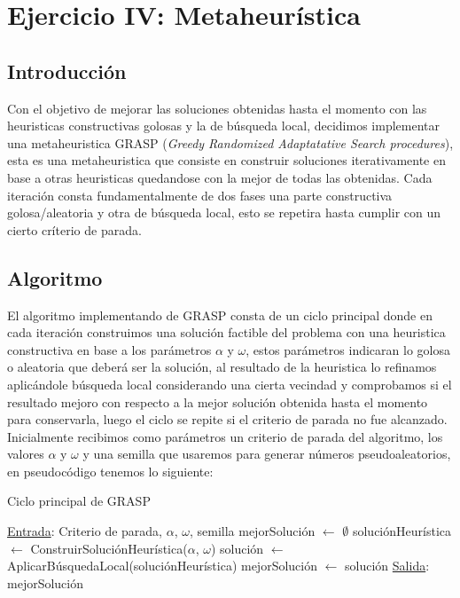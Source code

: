 \section{Ejercicio IV: Metaheur\'istica}

\subsection{Introducci\'on}

Con el objetivo de mejorar las soluciones obtenidas hasta el momento con las heuristicas constructivas golosas y la de búsqueda local, decidimos implementar una metaheuristica GRASP (\textit{Greedy Randomized Adaptatative Search procedures}), esta es una metaheuristica que consiste en construir soluciones iterativamente en base a otras heuristicas quedandose con la mejor de todas las obtenidas. Cada iteración consta fundamentalmente de dos fases una parte constructiva golosa/aleatoria y otra de búsqueda local, esto se repetira hasta cumplir con un cierto críterio de parada.

\subsection{Algoritmo}

El algoritmo implementando de GRASP consta de un ciclo principal donde en cada iteración construimos una solución factible del problema con una heuristica constructiva en base a los parámetros $\alpha$ y $\omega$, estos parámetros indicaran lo golosa o aleatoria que deberá ser la solución, al resultado de la heuristica lo refinamos aplicándole búsqueda local considerando una cierta vecindad y comprobamos si el resultado mejoro con respecto a la mejor solución obtenida hasta el momento para conservarla, luego el ciclo se repite si el criterio de parada no fue alcanzado. Inicialmente recibimos como parámetros un criterio de parada del algoritmo, los valores $\alpha$ y $\omega$ y una semilla que usaremos para generar números pseudoaleatorios, en pseudocódigo tenemos lo siguiente:


\begin{algorithm}[H]

\label{}
\caption{Ciclo principal de GRASP}

\begin{algorithmic}[1]

\Statex \underline{Entrada}: Criterio de parada, $\alpha$, $\omega$, semilla
\medskip
\State mejorSoluci\'on $\gets$ $\emptyset$
    \State soluci\'onHeur\'istica $\gets$ ConstruirSoluci\'onHeur\'istica($\alpha$, $\omega$)
	\State soluci\'on $\gets$ AplicarB\'usquedaLocal(soluci\'onHeur\'istica)
		\State mejorSoluci\'on $\gets$ soluci\'on
	\EndIf
\EndWhile
\medskip
\Statex \underline{Salida}: mejorSoluci\'on

\end{algorithmic}
\end{algorithm}

